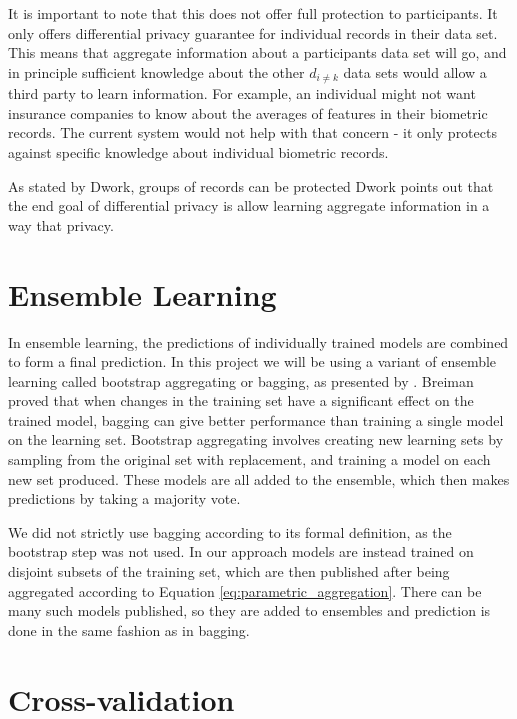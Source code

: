 It is important to note that this does not offer full protection to participants. It only offers differential privacy guarantee for individual records in their data set. This means that aggregate information about a participants data set will go, and in principle sufficient knowledge about the other $d_{i \neq k}$ data sets would allow a third party to learn information. For example, an individual might not want insurance companies to know about the averages of features in their biometric records. The current system would not help with that concern - it only protects against specific knowledge about 
individual biometric records. 

As stated by Dwork, groups of records can be protected  \cite{Dwork06differentialprivacy} Dwork points out that the end goal of differential privacy is allow learning aggregate information in a way that privacy. 

\section{Ensemble Learning}

In ensemble learning, the predictions of individually trained models are combined to form a final prediction\citep{opitz1999popularensemble}. In this project we will be using a variant of ensemble learning called bootstrap aggregating or bagging, as presented by \cite{breiman1996bagging}. Breiman proved that when changes in the training set have a significant effect on the trained model, bagging can give better performance than training a single model on the learning set. Bootstrap aggregating involves creating new learning sets by sampling from the original set with replacement, and training a model on each new set produced. These models are all added to the ensemble, which then makes predictions by taking a majority vote.

We did not strictly use bagging according to its formal definition, as the bootstrap step was not used. In our approach models are instead trained on disjoint subsets of the training set, which are then published after being aggregated according to Equation \ref{eq:parametric_aggregation}. There can be many such models published, so they are added to ensembles and prediction is done in the same fashion as in bagging. 

\section{Cross-validation} \label{sec:cross_validation}

